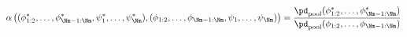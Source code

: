 \begin{equation}
  \alpha \left(
    (\phi_{1:2}^{*}, \ldots, \phi_{\Nm - 1:\Nm}^{*}, \psi_{1}^{*}, \ldots, \psi_{\Nm}^{*}),
    (\phi_{1:2}, \ldots, \phi_{\Nm - 1:\Nm}, \psi_{1}, \ldots, \psi_{\Nm})
  \right)
  =
  \frac {
    \pd_{\text{pool}}(\phi_{1:2}^{*}, \ldots, \phi_{\Nm - 1:\Nm}^{*})
  } {
    \pd_{\text{pool}}(\phi_{1:2}, \ldots, \phi_{\Nm - 1:\Nm})
  }
  \label{eqn:stage-Mplus1-acceptance-probability}
\end{equation}
